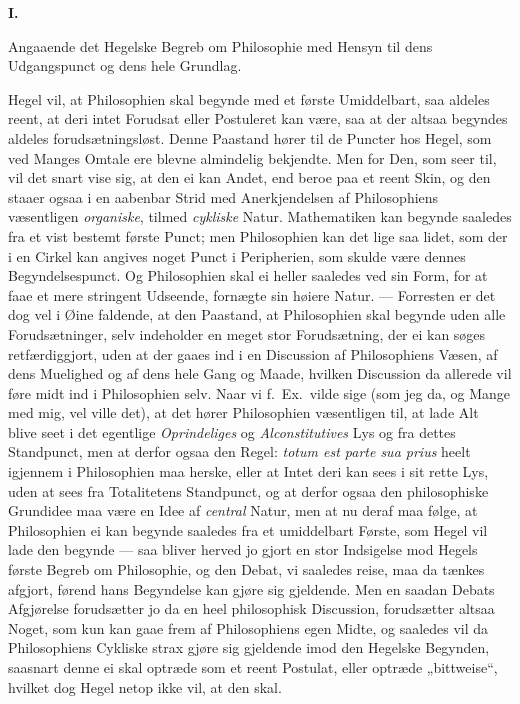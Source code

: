 \documentclass[12pt,a4paper]{book}
\newcommand{\apage}[1]{\marginnote{\footnotesize\textit{[#1]}}}
\begin{document}
\bigskip
\begin{center}
{\large\textbf{I.}}

\medskip
Angaaende det Hegelske Begreb om Philosophie med Hensyn til
dens Udgangspunct og dens hele Grundlag.
\end{center}
\bigskip

Hegel vil, at Philosophien skal begynde med et første Umiddelbart,
saa aldeles reent, at deri intet Forudsat eller Postuleret kan være,
saa at der altsaa begyndes aldeles forudsætningsløst. Denne Paastand
hører til de Puncter hos Hegel, som ved Manges Omtale ere blevne
almindelig bekjendte. Men for Den, som seer til, vil det snart vise
sig, at den ei kan Andet, end beroe paa et reent Skin, og den staaer
ogsaa i en aabenbar Strid med Anerkjendelsen af Philosophiens
væsentligen \emph{organiske}, tilmed \emph{cykliske} Natur. Mathematiken kan
begynde saaledes fra et vist bestemt første Punct; men Philosophien
kan det lige saa lidet, som der i en Cirkel kan angives noget Punct
i Peripherien, som skulde være dennes Begyndelsespunct. Og
Philosophien skal ei heller saaledes ved sin Form, for at faae et
mere stringent Udseende, fornægte sin høiere Natur. --- Forresten er
det dog vel i Øine faldende, at den Paastand, at Philosophien skal
begynde uden alle Forudsætninger, selv indeholder en meget stor
Forudsætning, der ei kan søges retfærdiggjort, uden at der gaaes ind
i en Discussion af Philosophiens Væsen, af dens Muelighed og af dens
hele Gang og Maade, hvilken Discussion da allerede vil føre midt ind
i Philosophien selv. Naar vi f.\ Ex.\ vilde sige (som jeg da, og
Mange med mig, vel ville det), at det hører Philosophien væsentligen
til, at lade Alt blive seet i det egentlige \emph{Oprindeliges} og
\emph{Alconstitutives} Lys og fra dettes Standpunct, men at derfor ogsaa den
Regel: \textit{totum est parte sua prius} \apage{34} heelt igjennem i
Philosophien maa herske, eller at Intet deri kan sees i sit rette Lys,
uden at sees fra Totalitetens Standpunct, og at derfor ogsaa den
philosophiske Grundidee maa være en Idee af \emph{central} Natur, men at nu
deraf maa følge, at Philosophien ei kan begynde saaledes fra et
umiddelbart Første, som Hegel vil lade den begynde --- saa bliver
herved jo gjort en stor Indsigelse mod Hegels første Begreb om
Philosophie, og den Debat, vi saaledes reise, maa da tænkes afgjort,
førend hans Begyndelse kan gjøre sig gjeldende. Men en saadan Debats
Afgjørelse forudsætter jo da en heel philosophisk Discussion,
forudsætter altsaa Noget, som kun kan gaae frem af Philosophiens egen
Midte, og saaledes vil da Philosophiens Cykliske strax gjøre sig
gjeldende imod den Hegelske Begynden, saasnart denne ei skal optræde
som et reent Postulat, eller optræde „bittweise“, hvilket dog Hegel
netop ikke vil, at den skal.
\end{document}
